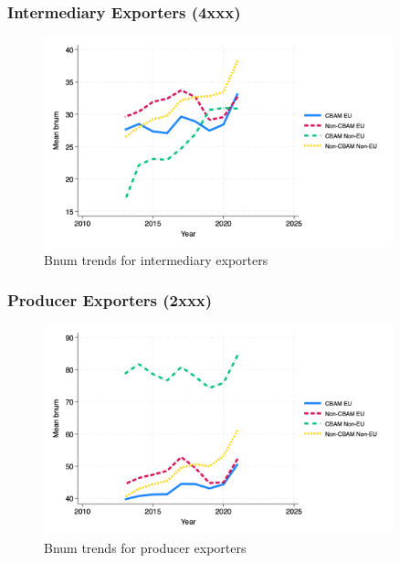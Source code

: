 \documentclass{article}
\begin{document}
\subsubsection{Intermediary Exporters (4xxx)}
\begin{figure}[h!]
\centering
\includegraphics[width=0.9\textwidth]{bnum_ei.png}
\caption{Bnum trends for intermediary exporters}
\label{fig:bnum_ei}
\end{figure}

\subsubsection{Producer Exporters (2xxx)}
\begin{figure}[h!]
\centering
\includegraphics[width=0.9\textwidth]{bnum_ep.png}
\caption{Bnum trends for producer exporters}
\label{fig:bnum_ep}
\end{figure}
\end{document}
